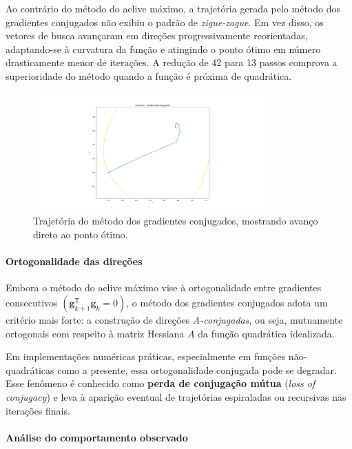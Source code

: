 \documentclass[12pt]{article}
\begin{document}
Ao contrário do método do aclive máximo, a trajetória gerada pelo método dos gradientes conjugados não exibiu o padrão de \textit{zigue-zague}. Em vez disso, os vetores de busca avançaram em direções progressivamente reorientadas, adaptando-se à curvatura da função e atingindo o ponto ótimo em número drasticamente menor de iterações. A redução de 42 para 13 passos comprova a superioridade do método quando a função é próxima de quadrática.

\begin{figure}
    \centering
    \includegraphics[width=0.8\textwidth]{img/GC1.png}
    \caption{Trajetória do método dos gradientes conjugados, mostrando avanço direto ao ponto ótimo.}
    \label{fig:gradientes_conjugados}
\end{figure}

\paragraph{Ortogonalidade das direções}

Embora o método do aclive máximo vise à ortogonalidade entre gradientes consecutivos \((\mathbf{g}_{k+1}^{\mathsf{T}} \mathbf{g}_k = 0)\), o método dos gradientes conjugados adota um critério mais forte: a construção de direções \textit{A-conjugadas}, ou seja, mutuamente ortogonais com respeito à matriz Hessiana \(A\) da função quadrática idealizada.

Em implementações numéricas práticas, especialmente em funções não-quadráticas como a presente, essa ortogonalidade conjugada pode se degradar. Esse fenômeno é conhecido como \textbf{perda de conjugação mútua} (\textit{loss of conjugacy}) e leva à aparição eventual de trajetórias espiraladas ou recursivas nas iterações finais.

\paragraph{Análise do comportamento observado}
\end{document}
